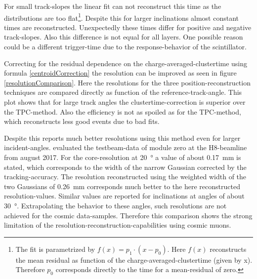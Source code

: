 \documentclass[
twoside,            %
BCOR1.4cm,          %
10pt,               %
headings=normal,    %
headsepline,        %
clearplainpage,		%
final,              %
div=14,
open=right,
bibliography=toc
]{scrreprt}
\begin{document}
For small track-slopes the linear fit can not reconstruct this time as the distributions are too flat\footnote{
	The fit is parametrized by $f(x)= p_1 \cdot ( x - p_0 )$.
	Here $f(x)$ reconstructs the mean residual as function of the charge-averaged-clustertime (given by x).
	Therefore $p_0$ corresponds directly to the time for a mean-residual of zero.
}.
Despite this for larger inclinations almost constant times are reconstructed.
Unexpectedly these times differ for positive and negative track-slopes.
Also this difference is not equal for all layers.
One possible reason could be a different trigger-time due to the response-behavior of the scintillator.

Correcting for the residual dependence on the charge-averaged-clustertime using formula \ref{centroidCorrection} the resolution can be improved as seen in figure \ref{resolutionComparison}.
Here the resolutions for the three position-reconstruction techniques are compared directly as function of the reference-track-angle.
This plot shows that for large track angles the clustertime-correction is superior over the \textmu TPC-method.
Also the efficiency is not as spoiled as for the \textmu TPC-method, which reconstructs less good events due to bad fits.

Despite this \cite{flierlThesis} reports much better resolutions using this method even for larger incident-angles.
\cite{flierlThesis} evaluated the testbeam-data of module zero at the H8-beamline from august 2017.
For the core-resolution at \SI{20}{\degree} a value of about \SI{0.17}{mm} is stated, which corresponds to the width of the narrow Gaussian corrected by the tracking-accuracy.
The resolution reconstructed using the weighted width of the two Gaussians of \SI{0.26}{mm} corresponds much better to the here reconstructed resolution-values.
Similar values are reported for inclinations at angles of about \SI{30}{\degree}.
Extrapolating the behavior to these angles, such resolutions are not achieved for the cosmic data-samples.
Therefore this comparison shows the strong limitation of the resolution-reconstruction-capabilities using cosmic muons.
\end{document}
